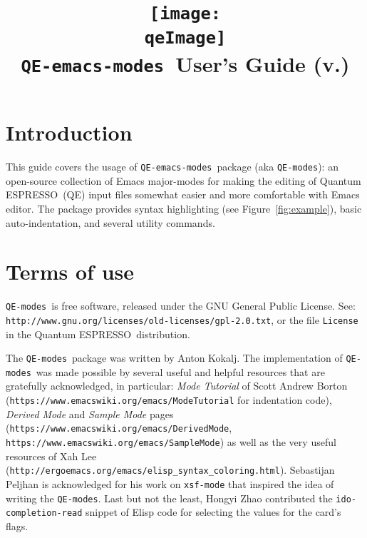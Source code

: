 \documentclass[12pt,a4paper]{article}
\def\qe{{\sc Quantum ESPRESSO}}
\def\QEmodes{\texttt{QE-modes}}
\def\QEemodes{\texttt{QE-emacs-modes}}
\begin{document}
 
\author{}
\date{}

\def\qeImage{../../../Doc/quantum_espresso.png}

\title{
  \texttt{[image: \\qeImage]} \\
  \Huge \QEemodes\ User's Guide (v.\version) 
}

\maketitle

\tableofcontents

\section{Introduction}

This guide covers the usage of \QEemodes\ package (aka \QEmodes): an
open-source collection of Emacs major-modes for making the editing of
\qe\ (QE) input files somewhat easier and more comfortable with Emacs
editor. The package provides syntax highlighting (see
Figure~\ref{fig:example}), basic auto-indentation, and several utility
commands.

\section{Terms of use}

\QEmodes\ is free software, released under the
GNU General Public License. See:
\texttt{http://www.gnu.org/licenses/old-licenses/gpl-2.0.txt}, or the
file \texttt{License} in the \qe\ distribution.

The \QEmodes\ package was written by Anton Kokalj. The implementation
of \QEmodes\ was made possible by several useful and helpful resources
that are gratefully acknowledged, in particular: {\it Mode Tutorial}
of Scott Andrew Borton
(\texttt{https://www.emacswiki.org/emacs/ModeTutorial} for indentation
code), {\it Derived Mode} and {\it Sample Mode} pages
(\texttt{https://www.emacswiki.org/emacs/DerivedMode},
\texttt{https://www.emacswiki.org/emacs/SampleMode}) as well as the
very useful resources of Xah Lee
(\texttt{http://ergoemacs.org/emacs/elisp\_syntax\_coloring.html}). Sebastijan
Peljhan is acknowledged for his work on \texttt{xsf-mode} that
inspired the idea of writing the \QEmodes. Last but not the least,
Hongyi Zhao contributed the \texttt{ido-completion-read} snippet of
Elisp code for selecting the values for the card's flags.

\end{document}
